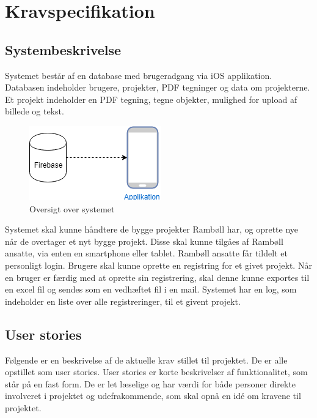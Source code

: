 	\chapter{Kravspecifikation}
	
	\section{Systembeskrivelse}
	Systemet består af en database med brugeradgang via iOS applikation.
	Databasen indeholder brugere, projekter, PDF tegninger og data om projekterne.
	Et projekt indeholder en PDF tegning, tegne objekter, mulighed for upload af billede og tekst.
	
	\begin{figure}[H]
		\centering
		\includegraphics[width=0.4\linewidth]{Kravspecifikation/Oversigtoversystem}
		\caption{Oversigt over systemet}
		\label{fig:OversigtSystembeskrivelse}
	\end{figure}
	
	Systemet skal kunne håndtere de bygge projekter Rambøll har, og oprette nye når de overtager et nyt bygge projekt.
	Disse skal kunne tilgåes af Rambøll ansatte, via enten en smartphone eller tablet.
	Rambøll ansatte får tildelt et personligt login.
	Brugere skal kunne oprette en registring for et givet projekt.
	Når en bruger er færdig med at oprette sin registrering, skal denne kunne exportes til en excel fil og sendes som en vedhæftet fil i en mail.
	Systemet har en log, som indeholder en liste over alle registreringer, til et givent projekt. \\	
				 
	
	\clearpage
		

\section{User stories} \label{sec:UserStories}
Følgende er en beskrivelse af de aktuelle krav stillet til projektet. De er alle opstillet som user stories. User stories er korte beskrivelser af funktionalitet, som står på en fast form. De er let læselige og har værdi for både personer direkte involveret i projektet og udefrakommende, som skal opnå en idé om kravene til projektet. 

